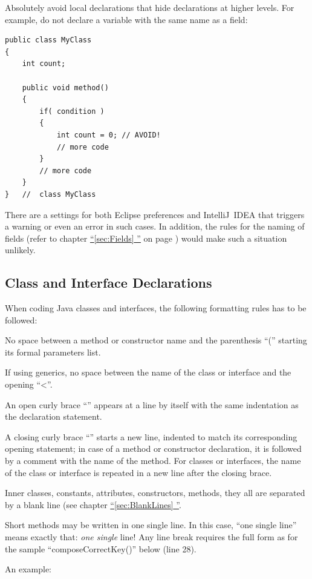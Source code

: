 \documentclass[12pt,a4paper,titlepage, parskip=half, headsepline, footsepline, cleardoubleplain]{scrbook}
\newcommand*{\tqfullref}[1]{\hyperref[{#1}]{“\ref*{#1} \nameref*{#1}”}}
\newcommand*{\tqfullvref}[1]{\hyperref[{#1}]{“\ref*{#1} \nameref*{#1}”} on page \pageref{#1}}
\begin{document}
Absolutely avoid local declarations that hide declarations at higher levels. For example, do not declare a variable with the same name as a field:
\begin{lstlisting}
public class MyClass
{
    int count;

    public void method()
    {
        if( condition )
        {
            int count = 0; // AVOID!
            // more code
        }
        // more code
    }
}   //  class MyClass
\end{lstlisting}
There are a settings for both Eclipse preferences and IntelliJ~IDEA that triggers a warning or even an error in such cases. In addition, the rules for the naming of fields (refer to chapter \tqfullvref{sec:Fields}) would make such a situation unlikely.

\subsection{Class and Interface Declarations}
When coding Java classes and interfaces, the following formatting rules has to be followed:
\begin{itemize}
\item{No space between a method or constructor name and the parenthesis “(” starting its formal parameters list.}
\item{If using generics, no space between the name of the class or interface and the opening “<”.}
\item{An open curly brace “{” appears at a line by itself with the same indentation as the declaration statement.}
\item{A closing curly brace “}” starts a new line, indented to match its corresponding opening statement; in case of a method or constructor declaration, it is followed by a comment with the name of the method. For classes or interfaces, the name of the class or interface is repeated in a new line after the closing brace.}
\item{Inner classes, constants, attributes, constructors, methods, they all are separated by a blank line (see chapter \tqfullref{sec:BlankLines}.}
\item{Short methods may be written in one single line. In this case, “one single line” means exactly that: \textit{one single} line! Any line break requires the full form as for the sample “composeCorrectKey()” below (line 28).}
\end{itemize}
An example:
\end{document}
